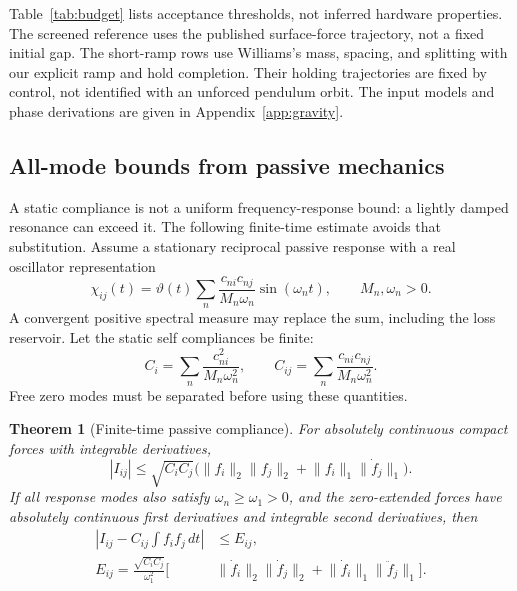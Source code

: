 \documentclass[aps,pra,reprint,amsmath,amssymb,longbibliography,floatfix]{revtex4-2}
\newtheorem{theorem}{Theorem}
\newcommand{\norm}[1]{\lVert#1\rVert}
\begin{document}
Table~\ref{tab:budget} lists acceptance thresholds, not inferred hardware properties. The screened reference uses the published surface-force trajectory, not a fixed initial gap. The short-ramp rows use Williams's mass, spacing, and splitting with our explicit ramp and hold completion. Their holding trajectories are fixed by control, not identified with an unforced pendulum orbit. The input models and phase derivations are given in Appendix~\ref{app:gravity}.

\subsection{All-mode bounds from passive mechanics}
A static compliance is not a uniform frequency-response bound: a lightly damped resonance can exceed it. The following finite-time estimate avoids that substitution. Assume a stationary reciprocal passive response with a real oscillator representation
\begin{equation}
\chi_{ij}(t)=\vartheta(t)\sum_n\frac{c_{ni}c_{nj}}{M_n\omega_n}\sin(\omega_nt),\qquad M_n,\omega_n>0.
\label{eq:modes}
\end{equation}
A convergent positive spectral measure may replace the sum, including the loss reservoir. Let the static self compliances be finite:
\begin{equation}
C_i=\sum_n\frac{c_{ni}^2}{M_n\omega_n^2},\qquad
C_{ij}=\sum_n\frac{c_{ni}c_{nj}}{M_n\omega_n^2}.
\label{eq:compliances}
\end{equation}
Free zero modes must be separated before using these quantities.

\begin{theorem}[Finite-time passive compliance]
For absolutely continuous compact forces with integrable derivatives,
\begin{equation}
|I_{ij}|\le\sqrt{C_iC_j}\bigl(\norm{f_i}_2\norm{f_j}_2+\norm{f_i}_1\norm{\dot f_j}_1\bigr).
\label{eq:passive}
\end{equation}
If all response modes also satisfy $\omega_n\ge\omega_1>0$, and the zero-extended forces have absolutely continuous first derivatives and integrable second derivatives, then
\begin{equation}
\begin{split}
\left|I_{ij}-C_{ij}\int f_if_j\,dt\right|&\le E_{ij},\\
E_{ij}=\frac{\sqrt{C_iC_j}}{\omega_1^2}\bigl[&\norm{\dot f_i}_2\norm{\dot f_j}_2
+\norm{\dot f_i}_1\norm{\ddot f_j}_1\bigr].
\end{split}
\label{eq:gap}
\end{equation}
\end{theorem}
\end{document}
